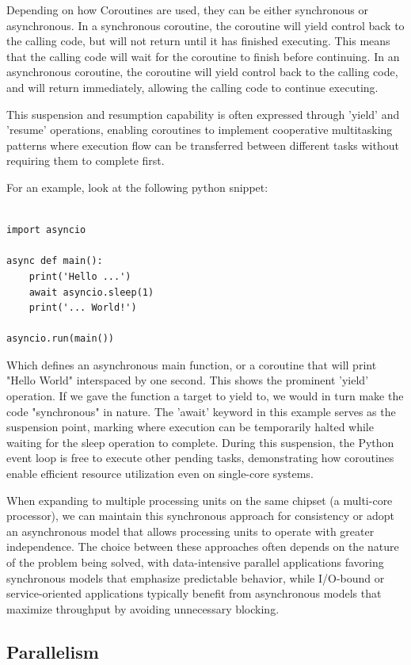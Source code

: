 \documentclass[12pt,a4paper]{article}
\begin{document}
Depending on how Coroutines are used, they can be either synchronous or asynchronous. In a synchronous coroutine, the coroutine will yield control back to the calling code, but will not return until it has finished executing. This means that the calling code will wait for the coroutine to finish before continuing. In an asynchronous coroutine, the coroutine will yield control back to the calling code, and will return immediately, allowing the calling code to continue executing.

This suspension and resumption capability is often expressed through 'yield' and 'resume' operations, enabling coroutines to implement cooperative multitasking patterns where execution flow can be transferred between different tasks without requiring them to complete first.

For an example, look at the following python snippet:
\begin{verbatim}

import asyncio

async def main():
    print('Hello ...')
    await asyncio.sleep(1)
    print('... World!')

asyncio.run(main())
\end{verbatim}

Which defines an asynchronous main function, or a coroutine that will print "Hello World" interspaced by one second. This shows the prominent 'yield' operation. If we gave the function a target to yield to, we would in turn make the code "synchronous" in nature. The 'await' keyword in this example serves as the suspension point, marking where execution can be temporarily halted while waiting for the sleep operation to complete. During this suspension, the Python event loop is free to execute other pending tasks, demonstrating how coroutines enable efficient resource utilization even on single-core systems.

When expanding to multiple processing units on the same chipset (a multi-core processor), we can maintain this synchronous approach for consistency or adopt an asynchronous model that allows processing units to operate with greater independence. The choice between these approaches often depends on the nature of the problem being solved, with data-intensive parallel applications favoring synchronous models that emphasize predictable behavior, while I/O-bound or service-oriented applications typically benefit from asynchronous models that maximize throughput by avoiding unnecessary blocking.

\subsection{Parallelism}
\end{document}
